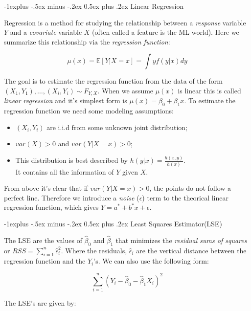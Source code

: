 \documentclass[landscape]{article}
\makeatletter
\renewcommand{\subsection}{\@startsection{subsection}{2}{0mm}%
                                {-1explus -.5ex minus -.2ex}%
                                {0.5ex plus .2ex}%
                                {\normalfont\normalsize\bfseries}}
\makeatother
\begin{document}
\begin{multicols}{3}
\subsection{Linear Regression}

Regression is a method for studying the relationship between a \emph{response} variable $Y$ and a \emph{covariate} variable $X$ (often called a feature is the ML world).
Here we summarize this relationship via the \emph{regression function}:

$$\mu(x) = \mathbb{E}[Y | X = x] = \int y f(y|x) dy$$

The goal is to estimate the regression function from the data of the form $(X_1, Y_1), \dots, (X_i, Y_i) \sim F_{Y,X}$. 
When we assume $\mu(x)$ is linear this is called \emph{linear regression} and it's simplest form is $\mu(x) = \beta_0 + \beta_1 x$.
To estimate the regression function we need some modeling assumptions:

\begin{itemize}[itemsep=0em]
    \item $(X_i, Y_i)$ are i.i.d from some unknown joint distribution;
    \item $var(X) > 0$ and $var(Y | X = x) > 0$;
    \item This distribution is best described by $h(y|x) = \frac{h(x, y)}{h(x)}$.\\
          It contains all the information of $Y$ given $X$.
\end{itemize}

From above it's clear that if $var(Y | X = x) > 0$, the points do not follow a perfect line. Therefore we introduce a \emph{noise} ($\epsilon$) term to the 
theorical linear regression function, which gives $Y = a^* + b^* x + \epsilon$. 

\subsection{Least Squares Estimator(LSE)}

The LSE are the values of $\widehat{\beta}_0$ and $\widehat{\beta}_1$ that minimizes the \emph{residual sums of squares} or $RSS = \sum_{i = 1}^{n} \widehat{\epsilon}_i^2$.
Where the residuals, $\widehat{\epsilon}_i$ are the vertical distance between the regression function and the $Y_i$'s. We can also use the following form:

$$\sum_{i = 1}^{n} (Y_i - \widehat{\beta}_0 - \widehat{\beta}_1 X_i)^2$$

The LSE's are given by:


\end{multicols}
\end{document}
